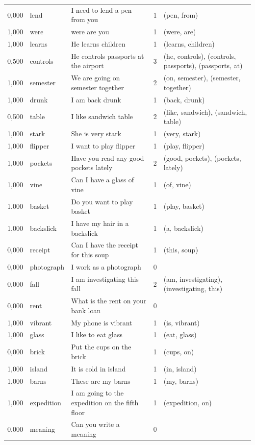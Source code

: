 \documentclass[a4paper,12pt]{article}
\begin{document}
\begin{landscape}
\begin{longtable}{l l l r l}
0,000 & lend & I need to lend a pen from you & 1 & (pen, from) \\
1,000 & were & were are you & 1 & (were, are) \\
1,000 & learns & He learns children & 1 & (learns, children) \\
0,500 & controls & He controls passports at the airport & 3 & (he, controls), (controls, passports), (passports, at) \\
1,000 & semester & We are going on semester together & 2 & (on, semester), (semester, together) \\
1,000 & drunk & I am back drunk & 1 & (back, drunk) \\
0,500 & table & I like sandwich table & 2 & (like, sandwich), (sandwich, table) \\
1,000 & stark & She is very stark & 1 & (very, stark) \\
1,000 & flipper & I want to play flipper & 1 & (play, flipper) \\
1,000 & pockets & Have you read any good pockets lately & 2 & (good, pockets), (pockets, lately) \\
1,000 & vine & Can I have a glass of vine & 1 & (of, vine) \\
1,000 & basket & Do you want to play basket & 1 & (play, basket) \\
1,000 & backslick & I have my hair in a backslick & 1 & (a, backslick) \\
0,000 & receipt & Can I have the receipt for this soup & 1 & (this, soup) \\
0,000 & photograph & I work as a photograph & 0 &  \\
0,000 & fall & I am investigating this fall & 2 & (am, investigating), (investigating, this) \\
0,000 & rent & What is the rent on your bank loan & 0 &  \\
1,000 & vibrant & My phone is vibrant & 1 & (is, vibrant) \\
1,000 & glass & I like to eat glass & 1 & (eat, glass) \\
0,000 & brick & Put the cups on the brick & 1 & (cups, on) \\
1,000 & island & It is cold in island & 1 & (in, island) \\
1,000 & barns & These are my barns & 1 & (my, barns) \\
1,000 & expedition & I am going to the expedition on the fifth floor & 1 & (expedition, on) \\
0,000 & meaning & Can you write a meaning & 0 &  \\

\end{longtable}
\end{landscape}
\end{document}

